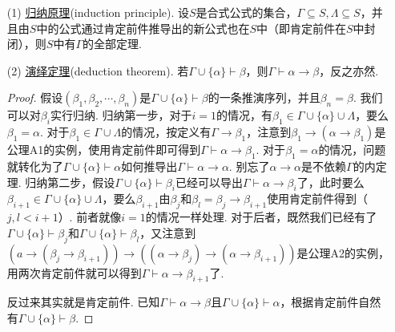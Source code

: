 \documentclass[main.tex]{subfiles}
\begin{document}
\begin{itemize}
    \item [(1)] \uline{归纳原理}(induction principle). 设\(S\)是合式公式的集合，\(\Gamma \subseteq S, \Lambda \subseteq S\)，并且由\(S\)中的公式通过肯定前件推导出的新公式也在\(S\)中（即肯定前件在\(S\)中封闭），则\(S\)中有\(\Gamma\)的全部定理.

    \item [(2)] \uline{演绎定理}(deduction theorem). 若\(\Gamma \cup \{\alpha\} \vdash \beta\)，则\(\Gamma \vdash \alpha \to \beta\)，反之亦然.
    \begin{proof}
        假设\((\beta_1,\beta_2,\cdots,\beta_n)\)是\(\Gamma \cup \{\alpha\} \vdash \beta\)的一条推演序列，并且\(\beta_n = \beta\). 我们可以对\(\beta_i\)实行归纳. \newline
        归纳第一步，对于\(i=1\)的情况，有\(\beta_1 \in \Gamma \cup \{\alpha\} \cup \Lambda\)，要么\(\beta_1 = \alpha\). 对于\(\beta_1 \in \Gamma \cup \Lambda\)的情况，按定义有\(\Gamma \to \beta_1\)，注意到\(\beta_1 \to (\alpha \to \beta_1)\)是公理A1的实例，使用肯定前件即可得到\(\Gamma \vdash \alpha \to \beta_1\). 对于\(\beta_1 = \alpha\)的情况，问题就转化为了\(\Gamma \cup \{\alpha\} \vdash \alpha\)如何推导出\(\Gamma \vdash \alpha \to \alpha\). 别忘了\(\alpha \to \alpha\)是不依赖\(\Gamma\)的内定理. \newline
        归纳第二步，假设\(\Gamma \cup \{\alpha\} \vdash \beta_i\)已经可以导出\(\Gamma \vdash \alpha \to \beta_i\)了，此时要么\(\beta_{i+1} \in \Gamma \cup \{\alpha\} \cup \Lambda\)，要么\(\beta_{i+1}\)由\(\beta_j\)和\(\beta_l = \beta_j \to \beta_{i+1}\)使用肯定前件得到（\(j,l < i+1\)）. 前者就像\(i=1\)的情况一样处理. 对于后者，既然我们已经有了\(\Gamma \cup \{\alpha\} \vdash \beta_j\)和\(\Gamma \cup \{\alpha\} \vdash \beta_l\)，又注意到\((a \to (\beta_j \to \beta_{i+1})) \to ((\alpha \to \beta_j) \to (\alpha \to \beta_{i+1}))\)是公理A2的实例，用两次肯定前件就可以得到\(\Gamma \vdash \alpha \to \beta_{i+1}\)了.

        反过来其实就是肯定前件. 已知\(\Gamma \vdash \alpha \to \beta\)且\(\Gamma \cup \{\alpha\} \vdash \alpha\)，根据肯定前件自然有\(\Gamma \cup \{\alpha\} \vdash \beta\).
    \end{proof}


\end{itemize}
\end{document}
